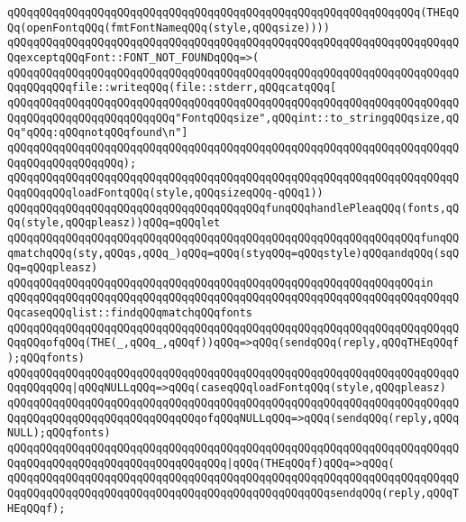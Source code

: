 \verb|qQQqqQQqqQQqqQQqqQQqqQQqqQQqqQQqqQQqqQQqqQQqqQQqqQQqqQQqqQQqqQQq(THEqQQq(openFontqQQq(fmtFontNameqQQq(style,qQQqsize))))|\newline
\verb|qQQqqQQqqQQqqQQqqQQqqQQqqQQqqQQqqQQqqQQqqQQqqQQqqQQqqQQqqQQqqQQqqQQqqQQqexceptqQQqFont::FONT_NOT_FOUNDqQQq=>(|\newline
\verb|qQQqqQQqqQQqqQQqqQQqqQQqqQQqqQQqqQQqqQQqqQQqqQQqqQQqqQQqqQQqqQQqqQQqqQQqqQQqqQQqfile::writeqQQq(file::stderr,qQQqcatqQQq[|\newline
\verb|qQQqqQQqqQQqqQQqqQQqqQQqqQQqqQQqqQQqqQQqqQQqqQQqqQQqqQQqqQQqqQQqqQQqqQQqqQQqqQQqqQQqqQQqqQQqqQQq"FontqQQqsize",qQQqint::to_stringqQQqsize,qQQq"qQQq:qQQqnotqQQqfound\n"]|\newline
\verb|qQQqqQQqqQQqqQQqqQQqqQQqqQQqqQQqqQQqqQQqqQQqqQQqqQQqqQQqqQQqqQQqqQQqqQQqqQQqqQQqqQQqqQQq);|\newline
\verb|qQQqqQQqqQQqqQQqqQQqqQQqqQQqqQQqqQQqqQQqqQQqqQQqqQQqqQQqqQQqqQQqqQQqqQQqqQQqqQQqloadFontqQQq(style,qQQqsizeqQQq-qQQq1))|\newline
\newline
\verb|qQQqqQQqqQQqqQQqqQQqqQQqqQQqqQQqqQQqqQQqfunqQQqhandlePleaqQQq(fonts,qQQq(style,qQQqpleasz))qQQq=qQQqlet|\newline
\verb|qQQqqQQqqQQqqQQqqQQqqQQqqQQqqQQqqQQqqQQqqQQqqQQqqQQqqQQqqQQqqQQqfunqQQqmatchqQQq(sty,qQQqs,qQQq_)qQQq=qQQq(styqQQq=qQQqstyle)qQQqandqQQq(sqQQq=qQQqpleasz)|\newline
\verb|qQQqqQQqqQQqqQQqqQQqqQQqqQQqqQQqqQQqqQQqqQQqqQQqqQQqqQQqqQQqqQQqin|\newline
\verb|qQQqqQQqqQQqqQQqqQQqqQQqqQQqqQQqqQQqqQQqqQQqqQQqqQQqqQQqqQQqqQQqqQQqqQQqcaseqQQqlist::findqQQqmatchqQQqfonts|\newline
\verb|qQQqqQQqqQQqqQQqqQQqqQQqqQQqqQQqqQQqqQQqqQQqqQQqqQQqqQQqqQQqqQQqqQQqqQQqqQQqofqQQq(THE(_,qQQq_,qQQqf))qQQq=>qQQq(sendqQQq(reply,qQQqTHEqQQqf);qQQqfonts)|\newline
\verb|qQQqqQQqqQQqqQQqqQQqqQQqqQQqqQQqqQQqqQQqqQQqqQQqqQQqqQQqqQQqqQQqqQQqqQQqqQQqqQQq|\verb#|qQQqNULLqQQq=>qQQq(caseqQQqloadFontqQQq(style,qQQqpleasz)#\newline
\verb|qQQqqQQqqQQqqQQqqQQqqQQqqQQqqQQqqQQqqQQqqQQqqQQqqQQqqQQqqQQqqQQqqQQqqQQqqQQqqQQqqQQqqQQqqQQqqQQqqQQqofqQQqNULLqQQq=>qQQq(sendqQQq(reply,qQQqNULL);qQQqfonts)|\newline
\verb|qQQqqQQqqQQqqQQqqQQqqQQqqQQqqQQqqQQqqQQqqQQqqQQqqQQqqQQqqQQqqQQqqQQqqQQqqQQqqQQqqQQqqQQqqQQqqQQqqQQqqQQq|\verb#|qQQq(THEqQQqf)qQQq=>qQQq(#\newline
\verb|qQQqqQQqqQQqqQQqqQQqqQQqqQQqqQQqqQQqqQQqqQQqqQQqqQQqqQQqqQQqqQQqqQQqqQQqqQQqqQQqqQQqqQQqqQQqqQQqqQQqqQQqqQQqqQQqqQQqqQQqsendqQQq(reply,qQQqTHEqQQqf);|\newline
